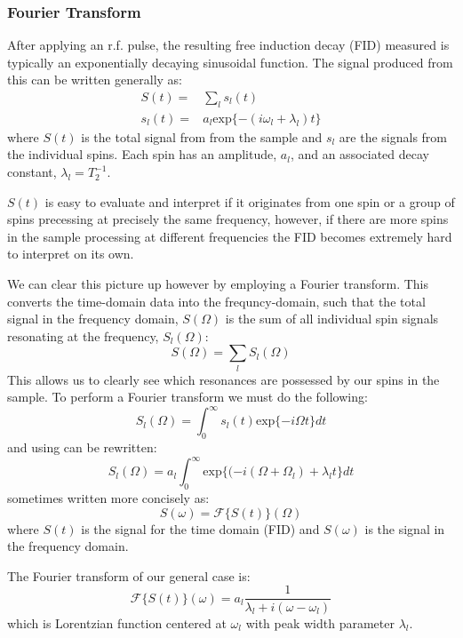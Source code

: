 \subsubsection{Fourier Transform}

After applying an r.f. pulse, the resulting free induction decay (FID) measured is typically an exponentially decaying sinusoidal function.
The signal produced from this can be written generally as:
\begin{align}\label{eqn:signal}
  S(t) =& \sum_l s_l(t) \\
  s_l(t) =& a_l\text{exp}\{-(i\omega_l+\lambda_l)t\}
\end{align}
where $S(t)$ is the total signal from from the sample and $s_l$ are the signals from the individual spins. Each spin has an
amplitude, $a_l$, and an associated decay constant, $\lambda_l = T_2^{-1}$.

$S(t)$ is easy to evaluate and interpret if it originates from one spin or a group of spins precessing
at precisely the same frequency, however, if there are more spins in the sample processing at different frequencies
the FID becomes extremely hard to interpret on its own.

We can clear this picture up however by employing a Fourier transform. This converts the time-domain data
into the frequncy-domain, such that the total signal in the frequency domain, $S(\Omega)$ is the sum of all individual spin signals resonating at the frequency, $S_l(\Omega)$:
\begin{equation}
  S(\Omega) = \sum_l S_l(\Omega)
\end{equation}
This allows us to clearly see which resonances are possessed by our spins in the sample. To
perform a Fourier transform we must do the following:
\begin{equation}
  S_l(\Omega) = \int_{0}^{\infty}s_l(t)\text{exp}\{-i\Omega t\}dt
\end{equation}
and using  can be rewritten:
\begin{equation}
  S_l(\Omega) = a_l\int_{0}^{\infty}\text{exp}\{(-i(\Omega+\Omega_l)+\lambda_l t\}dt
\end{equation}
sometimes written more concisely as:
\begin{equation}
  S(\omega) = \mathcal{F}\{S(t)\}(\Omega)
\end{equation}
where $S(t)$ is the signal for the time domain (FID) and $S(\omega)$ is the signal in the frequency domain.

The Fourier transform of our general case is:
\begin{equation}
  \mathcal{F}\{S(t)\}(\omega) = a_l\frac{1}{\lambda_l + i(\omega - \omega_l)}
\end{equation}
which is Lorentzian function centered at $\omega_l$ with peak width parameter $\lambda_l$.

